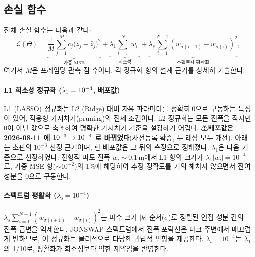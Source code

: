 \documentclass[11pt]{report}
\numberwithin{equation}{chapter}
\numberwithin{figure}{chapter}
\numberwithin{table}{chapter}
\begin{document}
\subsection{손실 함수}
\label{sec:loss}

전체 손실 함수는 다음과 같다:
\begin{equation}
  \mathcal{L}(\Theta) = \underbrace{\frac{1}{M}\sum_{j=1}^{M} c_j \bigl(z_j - \hat{z}_j\bigr)^2}_{\text{가중 MSE}}
    + \underbrace{\lambda_1 \sum_{i=1}^{N}|w_i|}_{\text{희소성}}
    + \underbrace{\lambda_s \sum_{i=1}^{N-1}(w_{\sigma(i+1)} - w_{\sigma(i)})^2}_{\text{스펙트럼 평활화}},
  \label{eq:loss}
\end{equation}
여기서 $M$은 프레임당 관측 점 수이다.
각 정규화 항의 설계 근거를 상세히 기술한다.

\paragraph{L1 희소성 정규화 ($\lambda_1 = 10^{-4}$, 배포값)}
L1 (LASSO) 정규화는 L2 (Ridge) 대비 자유 파라미터를 정확히 0으로 구동하는
특성이 있어, 적응형 가지치기(pruning)의 전제 조건이다.
L2 정규화는 모든 진폭을 작지만 0이 아닌 값으로 축소하여
명확한 가지치기 기준을 설정하기 어렵다.
⚠\textbf{배포값은 2026-08-11 에 $10^{-3} \to 10^{-4}$ 로 바뀌었다}(사전등록 확증, 두 레짐 모두 개선). 아래는 초판의 $10^{-3}$ 선정 근거이며,
현 배포값은 그 뒤의 측정으로 정해졌다. $\lambda_1$은 다음 기준으로 선정하였다:
전형적 파도 진폭 $w_i \sim 0.1$\,m에서 L1 항의 크기가
$\lambda_1 |w_i| = 10^{-4}$로, 가중 MSE 항($\sim 10^{-2}$)의 1\%에 해당하여
추정 정확도를 거의 해치지 않으면서 잔여 성분을 0으로 구동한다.

\paragraph{스펙트럼 평활화 ($\lambda_s = 10^{-4}$)}
$\lambda_s \sum_{i=1}^{N-1}(w_{\sigma(i+1)} - w_{\sigma(i)})^2$는
파수 크기 $|k|$ 순서($\sigma$)로 정렬된 인접 성분 간의 진폭 급변을 억제한다.
JONSWAP 스펙트럼에서 진폭 포락선은 피크 주변에서 매끄럽게 변하므로,
이 정규화는 물리적으로 타당한 귀납적 편향을 제공한다.
$\lambda_s = 10^{-4}$는 $\lambda_1$의 1/10로,
평활화가 희소성보다 약한 제약임을 반영한다.
\end{document}
